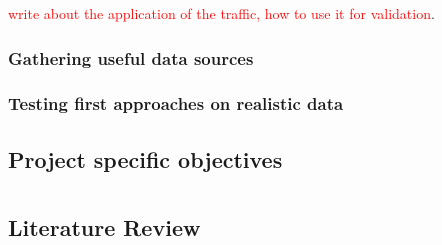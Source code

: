 \documentclass[a4paper,12pt,twoside]{report}
\begin{document}
\textcolor{red}{write about the application of the traffic, how to use it for validation}.

\subsection{Gathering useful data sources}

\subsection{Testing first approaches on realistic data}


\section{Project specific objectives}


\appendix
\chapter{}
\section{Literature Review}\label{litreview}



\end{document}
